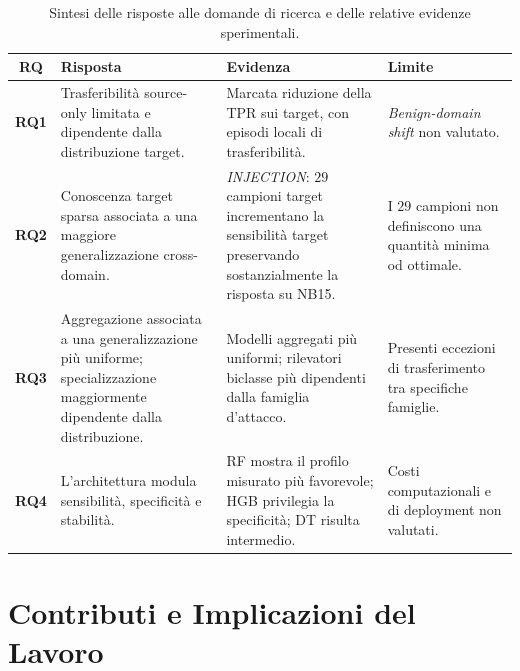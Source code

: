 \begin{table}[H]
    \centering
    \small
    \caption{Sintesi delle risposte alle domande di ricerca e delle relative evidenze sperimentali.}
    \label{tab:sintesi_rq}
    \begin{tabularx}{\textwidth}{c >{\raggedright\arraybackslash}X >{\raggedright\arraybackslash}X >{\raggedright\arraybackslash}X}
        \toprule
        \textbf{RQ} & \textbf{Risposta} & \textbf{Evidenza} & \textbf{Limite} \\
        \midrule
        \textbf{RQ1} &
        Trasferibilità source-only limitata e dipendente dalla distribuzione target. &
        Marcata riduzione della TPR sui target, con episodi locali di trasferibilità. &
        \textit{Benign-domain shift} non valutato. \\
        \addlinespace
        \textbf{RQ2} &
        Conoscenza target sparsa associata a una maggiore generalizzazione cross-domain. &
        \textit{INJECTION}: $29$ campioni target incrementano la sensibilità target preservando sostanzialmente la risposta su NB15. &
        I $29$ campioni non definiscono una quantità minima od ottimale. \\
        \addlinespace
        \textbf{RQ3} &
        Aggregazione associata a una generalizzazione più uniforme; specializzazione maggiormente dipendente dalla distribuzione. &
        Modelli aggregati più uniformi; rilevatori biclasse più dipendenti dalla famiglia d'attacco. &
        Presenti eccezioni di trasferimento tra specifiche famiglie. \\
        \addlinespace
        \textbf{RQ4} &
        L'architettura modula sensibilità, specificità e stabilità. &
        RF mostra il profilo misurato più favorevole; HGB privilegia la specificità; DT risulta intermedio. &
        Costi computazionali e di deployment non valutati. \\
        \bottomrule
    \end{tabularx}
\end{table}




\section{Contributi e Implicazioni del Lavoro}
\label{sec:contributi_implicazioni}

